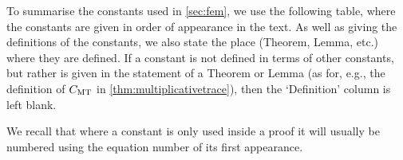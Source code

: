 To summarise the constants used in \cref{sec:fem}, we use the following table, where the constants are given in order of appearance in the text. As well as giving the definitions of the constants, we also state the place (Theorem, Lemma, etc.) where they are defined. If a constant is not defined in terms of other constants, but rather is given in the statement of a Theorem or Lemma (as for, e.g., the definition of $C_{\mathrm{MT}}$ in \cref{thm:multiplicativetrace}), then the `Definition' column is left blank.


We recall that where a constant is only used inside a proof it will usually be numbered using the equation number of its first appearance.
